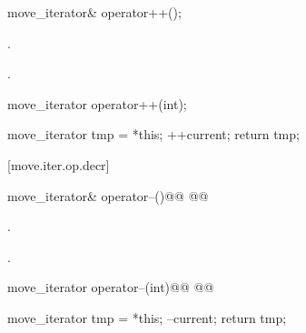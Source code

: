 %
%
\begin{itemdecl}
move_iterator& operator++();
\end{itemdecl}

\begin{itemdescr}
\pnum
\effects {} .

\pnum
\returns {}.
\end{itemdescr}

%
%
\begin{itemdecl}
move_iterator operator++(int);
\end{itemdecl}

\begin{itemdescr}
\pnum
\effects {}
\begin{codeblock}
move_iterator tmp = *this;
++current;
return tmp;
\end{codeblock}
\end{itemdescr}

[move.iter.op.decr]{}

%
%
\begin{itemdecl}
move_iterator& operator--()@\removed{;}@
  @@
\end{itemdecl}

\begin{itemdescr}
\pnum
\effects {} .

\pnum
\returns {}.
\end{itemdescr}

%
%
\begin{itemdecl}
move_iterator operator--(int)@\removed{;}@
  @@
\end{itemdecl}

\begin{itemdescr}
\pnum
\effects {}
\begin{codeblock}
move_iterator tmp = *this;
--current;
return tmp;
\end{codeblock}
\end{itemdescr}

